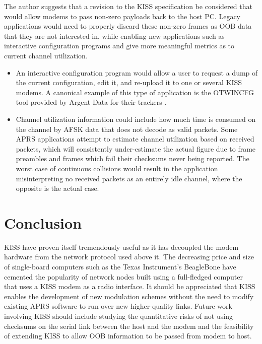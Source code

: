 The author suggests that a revision to the KISS specification be considered
that would allow modems to pass non-zero payloads back to the host PC.
Legacy applications would need to properly discard these non-zero frames
as OOB data that they are not interested in,
while enabling new applications such as interactive configuration programs
and give more meaningful metrics as to current channel utilization.
\begin{itemize}
	\item An interactive configuration program would allow a user
		to request a dump of the current configuration, edit it, and
		re-upload it to one or several KISS modems. A canonical example
		of this type of application is the OTWINCFG tool 
		provided by Argent Data for their trackers \cite[\S17.6]{ot3manual}.
	\item Channel utilization information could include how much time
		is consumed on the channel by AFSK data that does not decode as
		valid packets. Some APRS applications attempt to estimate channel
		utilization based on received packets, which will consistently
		under-estimate the actual figure due to frame preambles
		and frames which fail their checksums never being reported.
		The worst case of continuous collisions would result in
		the application misinterpreting no received packets as
		an entirely idle channel, where the opposite is the actual case.
\end{itemize}

\section{Conclusion}

KISS have proven itself tremendously useful as it has decoupled the modem
hardware from the network protocol used above it.
The decreasing price and size of single-board computers such as the
Texas Instrument's BeagleBone have cemented the popularity of
network nodes built using
a full-fledged computer that uses a KISS modem as a radio interface.
It should be appreciated that KISS enables the development of new
modulation schemes without the need to modify existing APRS software
to run over new higher-quality links.
Future work involving KISS should include studying the quantitative risks
of not using checksums on the serial link between the host and the modem
and the feasibility of extending KISS to allow OOB information to be passed
from modem to host.

